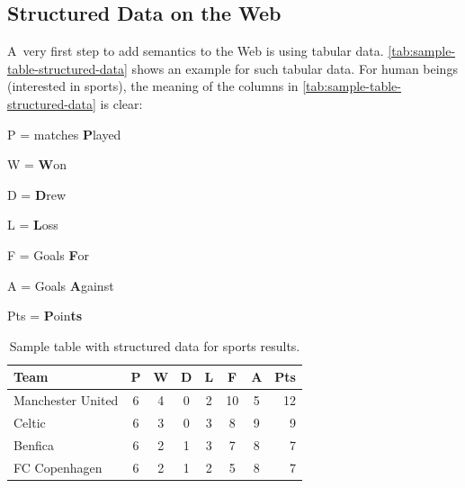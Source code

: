 \subsection{Structured Data on the Web}

A~very first step to add semantics to the Web
is using tabular data.
\autoref{tab:sample-table-structured-data} shows an example
for such tabular data.
For human beings (interested in sports),
the meaning of the columns in
\autoref{tab:sample-table-structured-data} is clear:

\begin{small_itemize}
  \item[] P = matches \textbf{P}layed
  \item[] W = \textbf{W}on 
  \item[] D = \textbf{D}rew
  \item[] L = \textbf{L}oss
  \item[] F = Goals \textbf{F}or
  \item[] A = Goals \textbf{A}gainst
  \item[] Pts = \textbf{P}oin\textbf{ts}
\end{small_itemize}

\begin{table}[b!]
  \begin{center}
    \begin{tabular}{l*{6}{c}r}
Team              & P & W & D & L & F  & A & Pts \\
\hline
Manchester United & 6 & 4 & 0 & 2 & 10 & 5 & 12  \\
Celtic            & 6 & 3 & 0 & 3 &  8 & 9 &  9  \\
Benfica           & 6 & 2 & 1 & 3 &  7 & 8 &  7  \\
FC Copenhagen     & 6 & 2 & 1 & 2 &  5 & 8 &  7  \\
    \end{tabular}
    \caption{Sample table with structured data for sports results.}
    \label{tab:sample-table-structured-data}
  \end{center}
\end{table}

